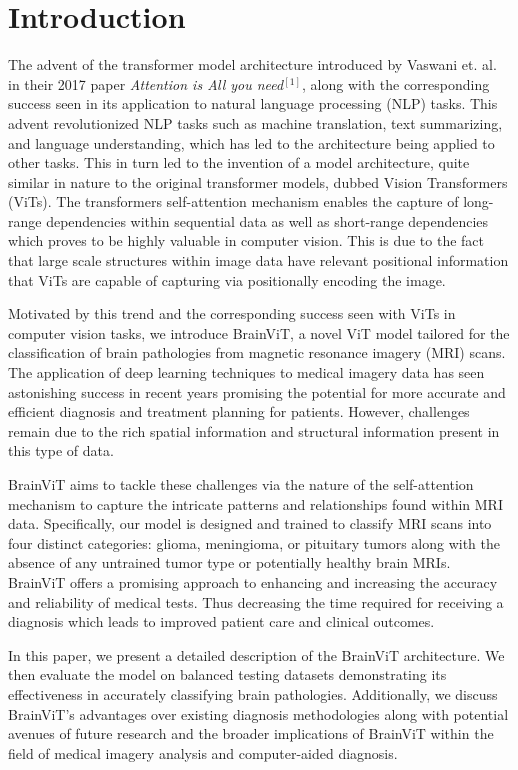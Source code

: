 \documentclass[conference]{IEEEtran}
\begin{document}
\section{Introduction}
The advent of the transformer model architecture introduced by Vaswani et. al. in their 2017 paper \textit{Attention is All you need}$^{[1]}$, along with the corresponding success seen in its application to natural language processing (NLP) tasks. This advent revolutionized NLP tasks such as machine translation, text summarizing, and language understanding, which has led to the architecture being applied to other tasks. This in turn led to the invention of a model architecture, quite similar in nature to the original transformer models, dubbed Vision Transformers (ViTs). The transformers self-attention mechanism enables the capture of long-range dependencies within sequential data as well as short-range dependencies which proves to be highly valuable in computer vision. This is due to the fact that large scale structures within image data have relevant positional information that ViTs are capable of capturing via positionally encoding the image.

Motivated by this trend and the corresponding success seen with ViTs in computer vision tasks, we introduce BrainViT, a novel ViT model tailored for the classification of brain pathologies from magnetic resonance imagery (MRI) scans. The application of deep learning techniques to medical imagery data has seen astonishing success in recent years promising the potential for more accurate and efficient diagnosis and treatment planning for patients. However, challenges remain due to the rich spatial information and structural information present in this type of data.

BrainViT aims to tackle these challenges via the nature of the self-attention mechanism to capture the intricate patterns and relationships found within MRI data. Specifically, our model is designed and trained to classify MRI scans into four distinct categories: glioma, meningioma, or pituitary tumors along with the absence of any untrained tumor type or potentially healthy brain MRIs. BrainViT offers a promising approach to enhancing and increasing the accuracy and reliability of medical tests. Thus decreasing the time required for receiving a diagnosis which leads to improved patient care and clinical outcomes. 

In this paper, we present a detailed description of the BrainViT architecture. We then evaluate the model on balanced testing datasets demonstrating its effectiveness in accurately classifying brain pathologies. Additionally, we discuss BrainViT's advantages over existing diagnosis methodologies along with potential avenues of future research and the broader implications of BrainViT within the field of medical imagery analysis and computer-aided diagnosis.
\end{document}
